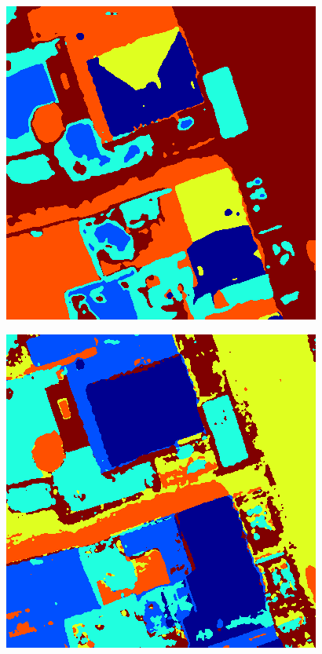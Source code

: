 \documentclass[a0,landscape]{a0poster}
\begin{document}
\begin{multicols}{4}
{ \centering
  \begin{minipage}{0.45\columnwidth}
    \centering
    \includegraphics[width=\textwidth]{./Images/DFC2015/specClust.png}%
  \end{minipage}\hfill %
  \begin{minipage}{0.45\columnwidth}
    \centering
    \includegraphics[width=\textwidth]{./Images/DFC2015/MBO.png}
  \end{minipage}
  \label{fig:DFCfig2}
}


\end{multicols}
\end{document}
